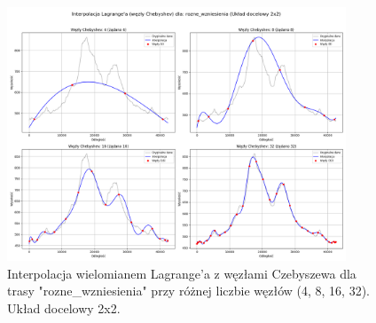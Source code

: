 \documentclass[11pt,a4paper]{article}
\begin{document}
\begin{figure}[H]
    \centering
    \includegraphics[width=0.9\textwidth]{rozne_wzniesienia_Lagrange_Chebyshev_2x2_subplots.png} %
    \caption{Interpolacja wielomianem Lagrange'a z węzłami Czebyszewa dla trasy "rozne\_wzniesienia" przy różnej liczbie węzłów (4, 8, 16, 32). Układ docelowy 2x2.}
    \label{fig:lagrange_chebyshev_rozne_wzniesienia}
\end{figure}
\end{document}
